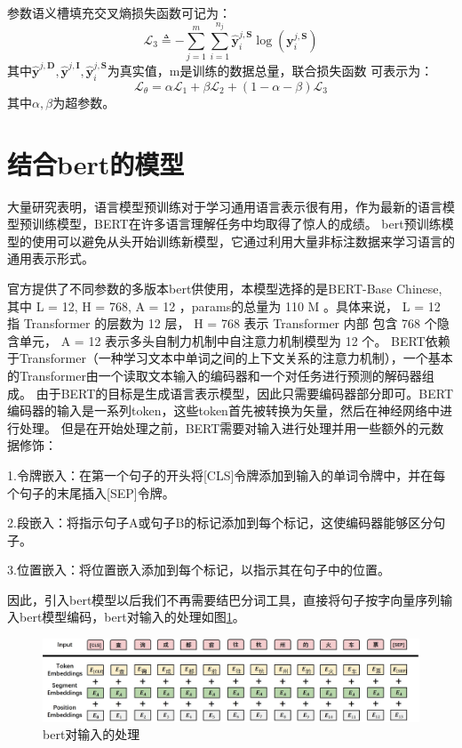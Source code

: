   参数语义槽填充交叉熵损失函数可记为：
  \begin{equation}
    \mathcal{L}_{3} \triangleq-\sum_{j=1}^{m} \sum_{i=1}^{n_{j}} \hat{\mathbf{y}}_{i}^{j, \mathbf{S}} \log \left(\mathbf{y}_{i}^{j, \mathbf{S}}\right)
  \end{equation}
  其中$\hat{\mathbf{y}}^{j, \mathbf{D}},\hat{\mathbf{y}}^{j, \mathbf{I}},\hat{\mathbf{y}}_{i}^{j, \mathbf{S}}$为真实值，m是训练的数据总量，联合损失函数
  可表示为：
  \begin{equation}
    \mathcal{L}_{\theta}=\alpha \mathcal{L}_{1}+\beta \mathcal{L}_{2}+(1-\alpha-\beta) \mathcal{L}_{3}
  \end{equation}
  其中$\alpha,\beta$为超参数。

\section{结合bert的模型}

大量研究表明，语言模型预训练对于学习通用语言表示很有用，作为最新的语言模型预训练模型，BERT在许多语言理解任务中均取得了惊人的成绩。
bert预训练模型的使用可以避免从头开始训练新模型，它通过利用大量非标注数据来学习语言的通用表示形式。

官方提供了不同参数的多版本bert供使用，本模型选择的是BERT-Base Chinese,
其中 L = 12, H = 768, A = 12 ，params的总量为 110 M 。具体来说， L = 12 指 Transformer 的层数为 12 层，
 H = 768 表示 Transformer 内部 包含 768 个隐含单元， A = 12 表示多头自制力机制中自注意力机制模型为 12 个\cite{devlin2018bert}。
 BERT依赖于Transformer（一种学习文本中单词之间的上下文关系的注意力机制），一个基本的Transformer由一个读取文本输入的编码器和一个对任务进行预测的解码器组成。
 由于BERT的目标是生成语言表示模型，因此只需要编码器部分即可。BERT编码器的输入是一系列token，这些token首先被转换为矢量，然后在神经网络中进行处理。
 但是在开始处理之前，BERT需要对输入进行处理并用一些额外的元数据修饰：

 1.令牌嵌入：在第一个句子的开头将[CLS]令牌添加到输入的单词令牌中，并在每个句子的末尾插入[SEP]令牌。

2.段嵌入：将指示句子A或句子B的标记添加到每个标记，这使编码器能够区分句子。

3.位置嵌入：将位置嵌入添加到每个标记，以指示其在句子中的位置。

因此，引入bert模型以后我们不再需要结巴分词工具，直接将句子按字向量序列输入bert模型编码，bert对输入的处理如图\ref{fig:bertInput}。
\begin{figure}[htbp]
  \centering
  \includegraphics[width=18cm]{./images/bertInput.jpg}
  \caption{bert对输入的处理}
  \label{fig:bertInput}
\end{figure}

